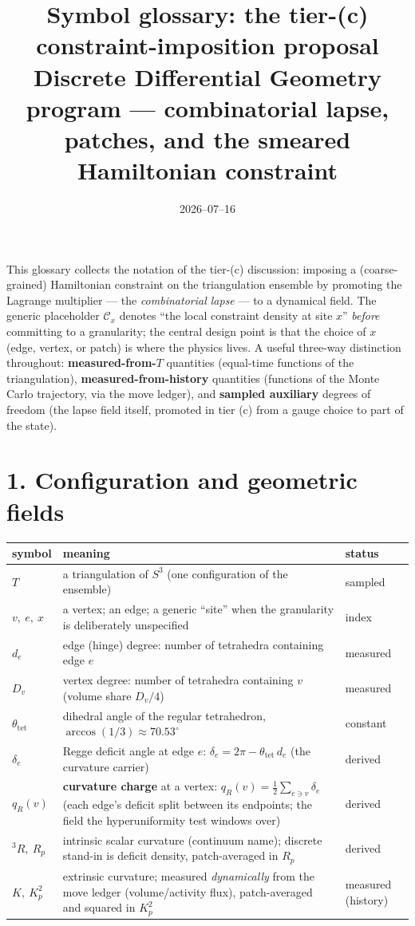 \documentclass[11pt]{article}
\title{Symbol glossary: the tier-(c) constraint-imposition proposal\\
\large Discrete Differential Geometry program --- combinatorial lapse, patches, and the smeared Hamiltonian constraint}
\author{}
\date{2026--07--16}
\newcommand{\C}{\mathcal{C}}
\begin{document}
\maketitle

\noindent
This glossary collects the notation of the tier-(c) discussion: imposing a
(coarse-grained) Hamiltonian constraint on the triangulation ensemble by
promoting the Lagrange multiplier --- the \emph{combinatorial lapse} --- to a
dynamical field. The generic placeholder $\C_x$ denotes ``the local constraint
density at site $x$'' \emph{before} committing to a granularity; the central
design point is that the choice of $x$ (edge, vertex, or patch) is where the
physics lives. A useful three-way distinction throughout:
\textbf{measured-from-$T$} quantities (equal-time functions of the
triangulation), \textbf{measured-from-history} quantities (functions of the
Monte Carlo trajectory, via the move ledger), and \textbf{sampled auxiliary}
degrees of freedom (the lapse field itself, promoted in tier (c) from a gauge
choice to part of the state).

\section*{1. Configuration and geometric fields}

\begin{tabularx}{\textwidth}{@{}l L l@{}}
\toprule
symbol & meaning & status \\
\midrule
$T$ & a triangulation of $S^3$ (one configuration of the ensemble) & sampled \\
$v,\ e,\ x$ & a vertex; an edge; a generic ``site'' when the granularity is deliberately unspecified & index \\
$d_e$ & edge (hinge) degree: number of tetrahedra containing edge $e$ & measured \\
$D_v$ & vertex degree: number of tetrahedra containing $v$ (volume share $D_v/4$) & measured \\
$\theta_{\mathrm{tet}}$ & dihedral angle of the regular tetrahedron, $\arccos(1/3)\approx 70.53^\circ$ & constant \\
$\delta_e$ & Regge deficit angle at edge $e$: $\delta_e = 2\pi - \theta_{\mathrm{tet}}\, d_e$ (the curvature carrier) & derived \\
$q_R(v)$ & \textbf{curvature charge} at a vertex: $q_R(v)=\tfrac12\sum_{e\ni v}\delta_e$ (each edge's deficit split between its endpoints; the field the hyperuniformity test windows over) & derived \\
${}^{3}\!R,\ R_p$ & intrinsic scalar curvature (continuum name); discrete stand-in is deficit density, patch-averaged in $R_p$ & derived \\
$K,\ K_p^2$ & extrinsic curvature; measured \emph{dynamically} from the move ledger (volume/activity flux), patch-averaged and squared in $K_p^2$ & measured (history) \\
\bottomrule
\end{tabularx}
\end{document}

